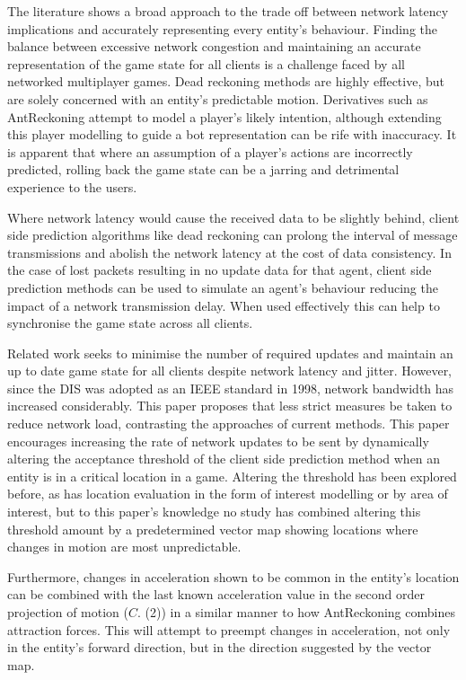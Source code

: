 \documentclass[journal]{IEEEtran}
\begin{document}
The literature shows a broad approach to the trade off between network latency implications and accurately representing every entity's behaviour. Finding the balance between excessive network congestion and maintaining an accurate representation of the game state for all clients is a challenge faced by all networked multiplayer games. Dead reckoning methods are highly effective, but are solely concerned with an entity's predictable motion. Derivatives such as AntReckoning attempt to model a player's likely intention, although extending this player modelling to guide a bot representation can be rife with inaccuracy. It is apparent that where an assumption of a player's actions are incorrectly predicted, rolling back the game state can be a jarring and detrimental experience to the users.

Where network latency would cause the received data to be slightly behind, client side prediction algorithms like dead reckoning can prolong the interval of message transmissions and abolish the network latency at the cost of data consistency. In the case of lost packets resulting in no update data for that agent, client side prediction methods can be used to simulate an agent's behaviour reducing the impact of a network transmission delay. When used effectively this can help to synchronise the game state across all clients.

Related work seeks to minimise the number of required updates and maintain an up to date game state for all clients despite network latency and jitter. However, since the DIS was adopted as an IEEE standard in 1998, network bandwidth has increased considerably. This paper proposes that less strict measures be taken to reduce network load, contrasting the approaches of current methods. This paper encourages increasing the rate of network updates to be sent by dynamically altering the acceptance threshold of the client side prediction method when an entity is in a critical location in a game. Altering the threshold has been explored before, as has location evaluation in the form of interest modelling or by area of interest, but to this paper's knowledge no study has combined altering this threshold amount by a predetermined vector map showing locations where changes in motion are most unpredictable.

Furthermore, changes in acceleration shown to be common in the entity's location can be combined with the last known acceleration value in the second order projection of motion ($C.$ (2)) in a similar manner to how AntReckoning combines attraction forces. This will attempt to preempt changes in acceleration, not only in the entity's forward direction, but in the direction suggested by the vector map.
\end{document}
